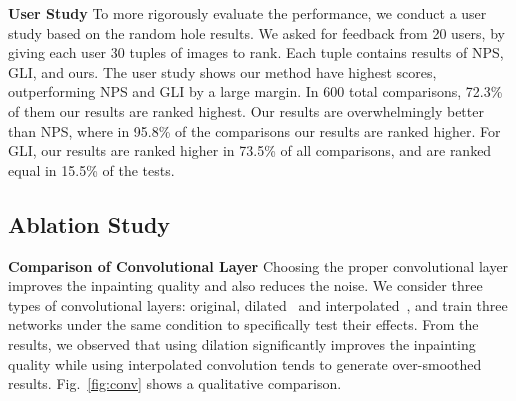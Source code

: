 \noindent\textbf{User Study}
To more rigorously evaluate the performance, we conduct a user study based on the random hole results. We asked for feedback from 20 users, by giving each user 30 tuples of images to rank. Each tuple contains results of NPS, GLI, and ours. The user study shows our method have highest scores, outperforming NPS and GLI by a large margin. In 600 total comparisons, 72.3\% of them our results are ranked highest. Our results are overwhelmingly better than NPS, where in 95.8\% of the comparisons our results are ranked higher. For GLI, our results are ranked higher in 73.5\% of all comparisons, and are ranked equal in 15.5\% of the tests. 

\subsection{Ablation Study}
\label{exp:study}

\noindent\textbf{Comparison of Convolutional Layer} Choosing the proper convolutional layer improves the inpainting quality and also reduces the noise. We consider three types of convolutional layers: original, dilated~\cite{yu2015multi} and interpolated~\cite{odena2016deconvolution}, and train three networks under the same condition to specifically test their effects. From the results, we observed that using dilation significantly improves the inpainting quality while using interpolated convolution tends to generate over-smoothed results. Fig.~\ref{fig:conv} shows a qualitative comparison. 

